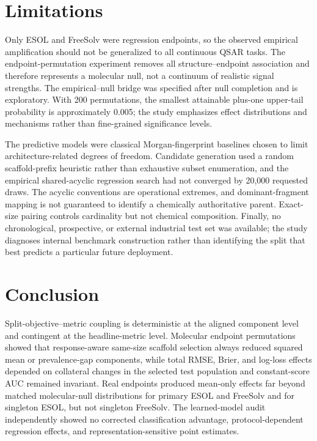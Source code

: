 \section{Limitations}

Only ESOL and FreeSolv were regression endpoints, so the observed empirical amplification should not be generalized to all continuous QSAR tasks. The endpoint-permutation experiment removes all structure--endpoint association and therefore represents a molecular null, not a continuum of realistic signal strengths. The empirical--null bridge was specified after null completion and is exploratory. With 200 permutations, the smallest attainable plus-one upper-tail probability is approximately 0.005; the study emphasizes effect distributions and mechanisms rather than fine-grained significance levels.

The predictive models were classical Morgan-fingerprint baselines chosen to limit architecture-related degrees of freedom. Candidate generation used a random scaffold-prefix heuristic rather than exhaustive subset enumeration, and the empirical shared-acyclic regression search had not converged by 20,000 requested draws. The acyclic conventions are operational extremes, and dominant-fragment mapping is not guaranteed to identify a chemically authoritative parent. Exact-size pairing controls cardinality but not chemical composition. Finally, no chronological, prospective, or external industrial test set was available; the study diagnoses internal benchmark construction rather than identifying the split that best predicts a particular future deployment.

\section{Conclusion}

Split-objective--metric coupling is deterministic at the aligned component level and contingent at the headline-metric level. Molecular endpoint permutations showed that response-aware same-size scaffold selection always reduced squared mean or prevalence-gap components, while total RMSE, Brier, and log-loss effects depended on collateral changes in the selected test population and constant-score AUC remained invariant. Real endpoints produced mean-only effects far beyond matched molecular-null distributions for primary ESOL and FreeSolv and for singleton ESOL, but not singleton FreeSolv. The learned-model audit independently showed no corrected classification advantage, protocol-dependent regression effects, and representation-sensitive point estimates.

